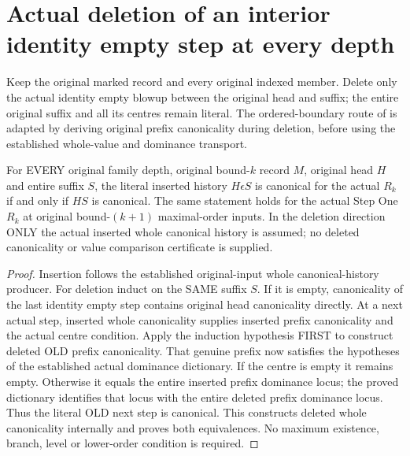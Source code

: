 \section{Actual deletion of an interior identity empty step at every depth}

Keep the original marked record and every original indexed member. Delete
only the actual identity empty blowup between the original head and suffix;
the entire original suffix and all its centres remain literal. The
ordered-boundary route of \cite{wlodarczyk05-hironaka,bierstone-milman08-functoriality}
is adapted by deriving original prefix canonicality during deletion, before
using the established whole-value and dominance transport.

\begin{theorem}
\label{hir:original-recursive-interior-empty-canonical-deletion-iff}
\leanok
For EVERY original family depth, original bound-$k$ record $M$, original
head $H$ and entire suffix $S$, the literal inserted history $H\epsilon S$
is canonical for the actual $R_k$ if and only if $HS$ is canonical.
The same statement holds for the actual Step One $R_k$ at original
bound-$(k+1)$ maximal-order inputs. In the deletion direction ONLY the actual
inserted whole canonical history is assumed; no deleted canonicality or
value comparison certificate is supplied.
\end{theorem}
\begin{proof}
Insertion follows the established original-input whole canonical-history
producer. For deletion induct on the SAME suffix $S$. If it is empty,
canonicality of the last identity empty step contains original head
canonicality directly. At a next actual step, inserted whole canonicality
supplies inserted prefix canonicality and the actual centre condition.
Apply the induction hypothesis FIRST to construct deleted OLD prefix
canonicality. That genuine prefix now satisfies the hypotheses of the
established actual dominance dictionary. If the centre is empty it remains
empty. Otherwise it equals the entire inserted prefix dominance locus;
the proved dictionary identifies that locus with the entire deleted prefix
dominance locus. Thus the literal OLD next step is canonical. This constructs
deleted whole canonicality internally and proves both equivalences. No
maximum existence, branch, level or lower-order condition is required.
\end{proof}

